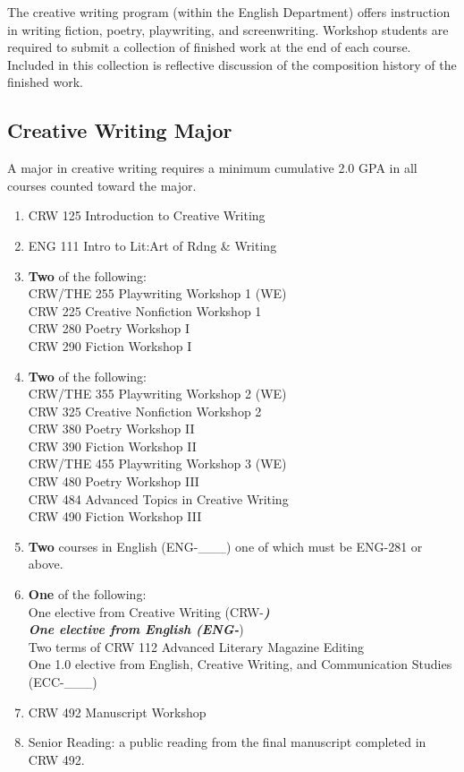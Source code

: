 \documentclass[
  letterpaper,
]{scrbook}
\providecommand{\tightlist}{%
  \setlength{\itemsep}{0pt}\setlength{\parskip}{0pt}}
\begin{document}
The creative writing program (within the English Department) offers
instruction in writing fiction, poetry, playwriting, and screenwriting.
Workshop students are required to submit a collection of finished work
at the end of each course. Included in this collection is reflective
discussion of the composition history of the finished work.

\subsection{Creative Writing Major}\label{creative-writing-major}

A major in creative writing requires a minimum cumulative 2.0 GPA in all
courses counted toward the major.

\begin{enumerate}
\def\labelenumi{\arabic{enumi}.}
\tightlist
\item
  CRW 125 Introduction to Creative Writing\\
\item
  ENG 111 Intro to Lit:Art of Rdng \& Writing\\
\item
  \textbf{Two} of the following:\\
  CRW/THE 255 Playwriting Workshop 1 (WE)\\
  CRW 225 Creative Nonfiction Workshop 1\\
  CRW 280 Poetry Workshop I\\
  CRW 290 Fiction Workshop I\\
\item
  \textbf{Two} of the following:\\
  CRW/THE 355 Playwriting Workshop 2 (WE)\\
  CRW 325 Creative Nonfiction Workshop 2\\
  CRW 380 Poetry Workshop II\\
  CRW 390 Fiction Workshop II\\
  CRW/THE 455 Playwriting Workshop 3 (WE)\\
  CRW 480 Poetry Workshop III\\
  CRW 484 Advanced Topics in Creative Writing\\
  CRW 490 Fiction Workshop III\\
\item
  \textbf{Two} courses in English (ENG-\_\_\_) one of which must be
  ENG-281 or above.\\
\item
  \textbf{One} of the following:\\
  One elective from Creative Writing (CRW-\textbf{\emph{)\\
  One elective from English (ENG-}})\\
  Two terms of CRW 112 Advanced Literary Magazine Editing\\
  One 1.0 elective from English, Creative Writing, and Communication
  Studies (ECC-\_\_\_)
\item
  CRW 492 Manuscript Workshop\\
\item
  Senior Reading: a public reading from the final manuscript completed
  in CRW 492.
\end{enumerate}
\end{document}

